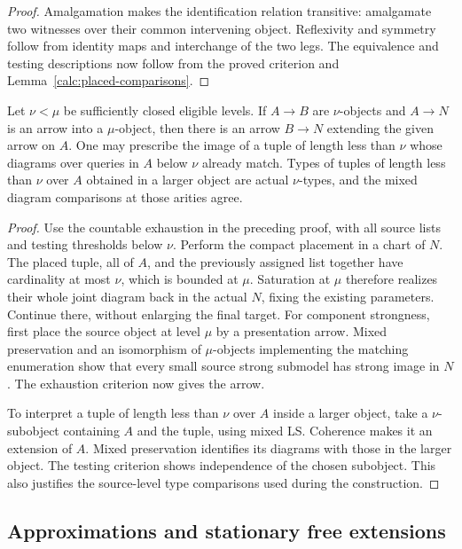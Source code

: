 \begin{proof}
Amalgamation makes the identification relation transitive: amalgamate
two witnesses over their common intervening object.  Reflexivity and
symmetry follow from identity maps and interchange of the two legs.
The equivalence and testing descriptions now follow from the proved
criterion and Lemma~\ref{calc:placed-comparisons}.
\end{proof}

\begin{corollary}
\label{calc:mixed-realization}
Let $\nu<\mu$ be sufficiently closed eligible levels.  If $A\to B$ are
$\nu$-objects and $A\to N$ is an arrow into a $\mu$-object, then there
is an arrow $B\to N$ extending the given arrow on $A$.  One may prescribe
the image of a tuple of length less than $\nu$ whose diagrams over
queries in $A$ below $\nu$ already match.  Types of tuples of length
less than $\nu$ over $A$ obtained in a larger object are actual
$\nu$-types, and the mixed diagram comparisons at those arities agree.
\end{corollary}

\begin{proof}
Use the countable exhaustion in the preceding proof, with all source
lists and testing thresholds below $\nu$.  Perform the compact
placement in a chart of $N$.  The placed tuple, all of $A$, and the
previously assigned list together have cardinality at most $\nu$, which
is bounded at $\mu$.  Saturation at $\mu$ therefore realizes their
whole joint diagram back in the actual $N$, fixing the existing
parameters.  Continue there, without enlarging the final target.
For component strongness, first place the source object at level $\mu$
by a presentation arrow.  Mixed preservation and an isomorphism of
$\mu$-objects implementing the matching enumeration show that every
small source strong submodel has strong image in $N$.  The exhaustion
criterion now gives the arrow.

To interpret a tuple of length less than $\nu$ over $A$ inside a larger
object, take a $\nu$-subobject containing $A$ and the tuple, using mixed
LS.  Coherence makes it an extension of $A$.  Mixed preservation
identifies its diagrams with those in the larger object.  The testing
criterion shows independence of the chosen subobject.  This also
justifies the source-level type comparisons used during the construction.
\end{proof}

\subsection{Approximations and stationary free extensions}

